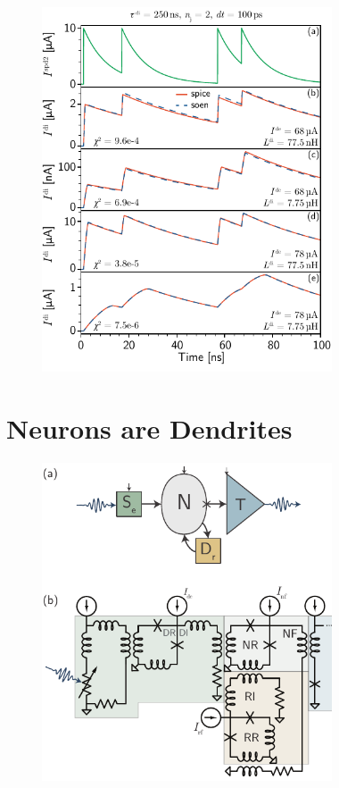 \documentclass[twocolumn]{article}
\begin{document}
\begin{figure}[h!]
\includegraphics[width=8.6cm]{figures/_fig__synapses__comparison__2jj__pulse_sequence.pdf}
\end{figure}

\section{\label{sec:neurons}Neurons are Dendrites}

\begin{figure}[h!]
\includegraphics[width=8.6cm]{figures/_fig__neuron__one_synapse__schematic__circuit.pdf}
\end{figure}
\end{document}
